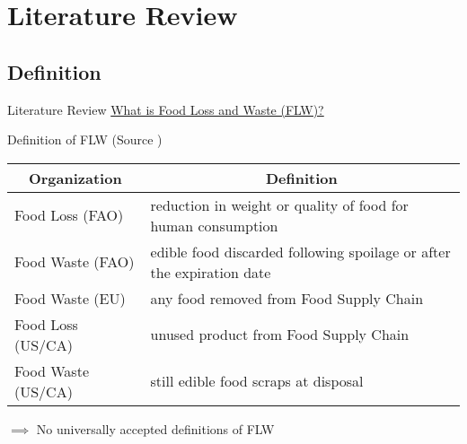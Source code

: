 \documentclass{beamer}\usepackage[]{graphicx}\usepackage[]{xcolor}
\begin{document}
\section{Literature Review}
\subsection{Definition}
\begin{frame}{Literature Review}
    \underline{What is Food Loss and Waste (FLW)?}
    \begin{block}{Definition of FLW (Source \cite{Ishangulyyev2019-uu})}
        \begin{table}[h]
            \begin{tabularx}{\textwidth}{l|X}
            \multicolumn{1}{c}{Organization} & \multicolumn{1}{c}{Definition} \\ \hline
                \small Food Loss (FAO)     
                & \footnotesize reduction in weight or quality of food for human consumption \\
                \small Food Waste (FAO)    
                & \footnotesize edible food discarded following spoilage or after the expiration date\\ \hline
                \small Food Waste (EU)     
                & \footnotesize any food removed from Food Supply Chain    \\ \hline
                \small Food Loss (US/CA)   
                & \small unused product from Food Supply Chain \\
                \small Food Waste (US/CA)  
                & \footnotesize still edible food scraps at disposal\\ \hline
            \end{tabularx}
        \end{table}
    \end{block}
    $\implies$ No universally accepted definitions of FLW


\end{frame}
\end{document}
